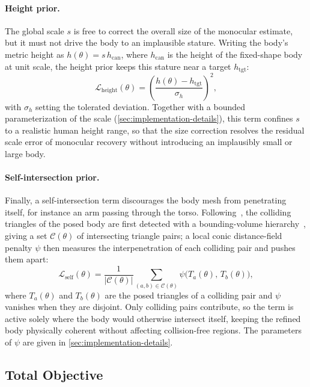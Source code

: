 \paragraph{Height prior.} The global scale $s$ is free to correct the overall size of the monocular estimate, but it must not drive the body to an implausible stature. Writing the body's metric height as $h(\theta) = s\, h_{\mathrm{can}}$, where $h_{\mathrm{can}}$ is the height of the fixed-shape body at unit scale, the height prior keeps this stature near a target $h_{\mathrm{tgt}}$:
\begin{equation}
\label{eq:height-prior-loss}
\mathcal{L}_{\mathrm{height}}(\theta)
=
\left( \frac{h(\theta) - h_{\mathrm{tgt}}}{\sigma_h} \right)^{2},
\end{equation}
with $\sigma_h$ setting the tolerated deviation. Together with a bounded parameterization of the scale (\cref{sec:implementation-details}), this term confines $s$ to a realistic human height range, so that the size correction resolves the residual scale error of monocular recovery without introducing an implausibly small or large body.

\paragraph{Self-intersection prior.} Finally, a self-intersection term discourages the body mesh from penetrating itself, for instance an arm passing through the torso. Following~\cite{tzionas2016capturing}, the colliding triangles of the posed body are first detected with a bounding-volume hierarchy~\cite{karras2012bvh}, giving a set $\mathcal{C}(\theta)$ of intersecting triangle pairs; a local conic distance-field penalty $\psi$ then measures the interpenetration of each colliding pair and pushes them apart:
\begin{equation}
\label{eq:self-intersection-loss}
\mathcal{L}_{\mathrm{self}}(\theta)
=
\frac{1}{|\mathcal{C}(\theta)|}
\sum_{(a, b) \in \mathcal{C}(\theta)}
\psi\bigl( T_a(\theta),\, T_b(\theta) \bigr),
\end{equation}
where $T_a(\theta)$ and $T_b(\theta)$ are the posed triangles of a colliding pair and $\psi$ vanishes when they are disjoint. Only colliding pairs contribute, so the term is active solely where the body would otherwise intersect itself, keeping the refined body physically coherent without affecting collision-free regions. The parameters of $\psi$ are given in \cref{sec:implementation-details}.

\subsection{Total Objective}
\label{sec:method-total-objective}

